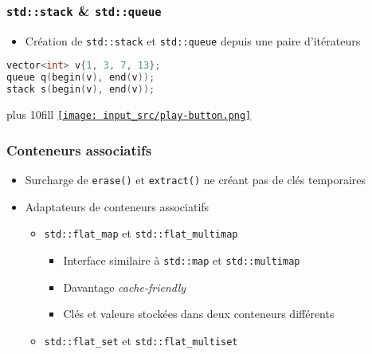 \documentclass[C++.tex]{subfiles}
\begin{document}
\begin{frame}[fragile]
	\frametitle{\lstinline|std::stack| \& \lstinline|std::queue|}
	\begin{itemize}
		\item Création de \lstinline|std::stack| et \lstinline|std::queue| depuis une paire d'itérateurs
	\end{itemize}

	\begin{lstlisting}[language=C++]
vector<int> v{1, 3, 7, 13};
queue q(begin(v), end(v));
stack s(begin(v), end(v));\end{lstlisting}

	\vskip 10mm plus 10fill
	\hfill
	\href{https://godbolt.org/#g:!((g:!((g:!((h:codeEditor,i:(filename:'1',fontScale:14,fontUsePx:'0',j:1,lang:c%2B%2B,selection:(endColumn:1,endLineNumber:16,positionColumn:1,positionLineNumber:16,selectionStartColumn:1,selectionStartLineNumber:1,startColumn:1,startLineNumber:1),source:'%23include+%3Ciostream%3E%0A%23include+%3Cvector%3E%0A%23include+%3Cqueue%3E%0A%23include+%3Cstack%3E%0A%0Aint+main()%0A%7B%0A++std::vector%3Cint%3E+v%7B1,+3,+7,+13%7D%3B%0A%0A++std::queue+q(std::begin(v),+std::end(v))%3B%0A++std::stack+s(std::begin(v),+std::end(v))%3B%0A%0A++std::cout+%3C%3C+q.front()+%3C%3C+%22%5Cn%22%3B%0A++std::cout+%3C%3C+s.top()+%3C%3C+%22%5Cn%22%3B%0A%7D%0A'),l:'5',n:'0',o:'C%2B%2B+source+%231',t:'0')),k:50,l:'4',n:'0',o:'',s:0,t:'0'),(g:!((h:executor,i:(argsPanelShown:'1',compilationPanelShown:'0',compiler:g122,compilerName:'',compilerOutShown:'0',execArgs:'',execStdin:'',fontScale:14,fontUsePx:'0',j:1,lang:c%2B%2B,libs:!((name:boost,ver:'175')),options:'-std%3Dc%2B%2B23+-Wall+-Wextra+-pedantic',source:1,stdinPanelShown:'1',tree:'1',wrap:'0'),l:'5',n:'0',o:'Executor+x86-64+gcc+12.2+(C%2B%2B,+Editor+%231)',t:'0')),header:(),k:50,l:'4',n:'0',o:'',s:0,t:'0')),l:'2',n:'0',o:'',t:'0')),version:4}{\texttt{[image: input\_src/play-button.png]}}
\end{frame}

\begin{frame}[fragile]
	\frametitle{Conteneurs associatifs}
	\begin{itemize}
		\item Surcharge de \lstinline|erase()| et \lstinline|extract()| ne créant pas de clés temporaires
		\item Adaptateurs de conteneurs associatifs
		\begin{itemize}
			\item \lstinline|std::flat_map| et \lstinline|std::flat_multimap|
			\begin{itemize}
				\item Interface similaire à \lstinline|std::map| et \lstinline|std::multimap|
				\item Davantage \textit{cache-friendly}
				\item Clés et valeurs stockées dans deux conteneurs différents
			\end{itemize}
			\item \lstinline|std::flat_set| et \lstinline|std::flat_multiset|
		\end{itemize}
	\end{itemize}
\end{frame}
\end{document}
